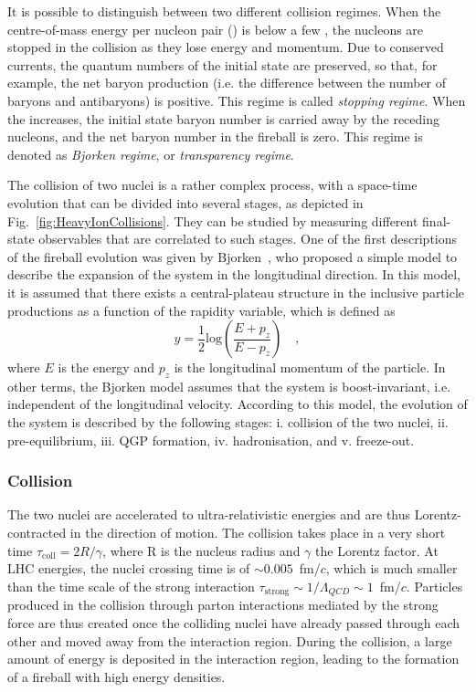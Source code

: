 It is possible to distinguish between two different collision regimes. When the centre-of-mass energy per nucleon pair (\snn) is below a few \gev, the nucleons are stopped in the collision as they lose energy and momentum. Due to conserved currents, the quantum numbers of the initial state are preserved, so that, for example, the net baryon production (i.e. the difference between the number of baryons and antibaryons) is positive. This regime is called \emph{stopping regime}. When the \snn increases, the initial state baryon number is carried away by the receding nucleons, and the net baryon number in the fireball is zero. This regime is denoted as \emph{Bjorken regime}, or \emph{transparency regime}. 

The collision of two nuclei is a rather complex process, with a space-time evolution that can be divided into several stages, as depicted in Fig.~\ref{fig:HeavyIonCollisions}. They can be studied by measuring different final-state observables that are correlated to such stages. One of the first descriptions of the fireball evolution was given by Bjorken~\cite{Bjorken:1982qr}, who proposed a simple model to describe the expansion of the system in the longitudinal direction. In this model, it is assumed that there exists a central-plateau structure in the inclusive particle productions as a function of the rapidity variable, which is defined as 
\begin{equation*}
    y = \frac{1}{2}\mathrm{log}\left(\frac{E+p_z}{E-p_z}\right)\quad ,
\end{equation*}
where $E$ is the energy and $p_z$ is the longitudinal momentum of the particle. In other terms, the Bjorken model assumes that the system is boost-invariant, i.e. independent of the longitudinal velocity. According to this model, the evolution of the system is described by the following stages: i. collision of the two nuclei, ii. pre-equilibrium, iii. QGP formation, iv. hadronisation, and v. freeze-out.

\subsubsection{Collision}
The two nuclei are accelerated to ultra-relativistic energies and are thus Lorentz-contracted in the direction of motion. The collision takes place in a very short time $\tau_\mathrm{coll} = 2R/\gamma$, where R is the nucleus radius and $\gamma$ the Lorentz factor. At LHC energies, the nuclei crossing time is of $\sim 0.005$~fm/$c$, which is much smaller than the time scale of the strong interaction $\tau_\mathrm{strong} \sim 1/\Lambda_{QCD} \sim 1$~fm/$c$. Particles produced in the collision through parton interactions mediated by the strong force are thus created once the colliding nuclei have already passed through each other and moved away from the interaction region. During the collision, a large amount of energy is deposited in the interaction region, leading to the formation of a fireball with high energy densities.

